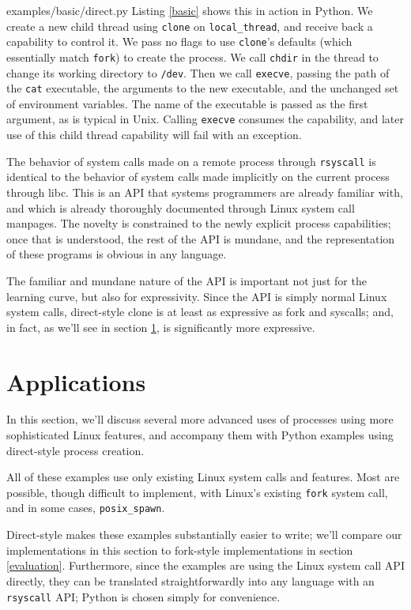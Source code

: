 \documentclass[sigplan]{acmart}
\begin{document}

{examples/basic/direct.py}
Listing \ref{basic} shows this in action in Python.
We create a new child thread using \texttt{clone} on \verb|local_thread|,
and receive back a capability to control it.
We pass no flags to use \texttt{clone}'s defaults
(which essentially match \texttt{fork}) to create the process.
We call \texttt{chdir} in the thread to change its working directory to \texttt{/dev}.
Then we call \texttt{execve},
passing the path of the \texttt{cat} executable,
the arguments to the new executable,
and the unchanged set of environment variables.
The name of the executable is passed as the first argument,
as is typical in Unix.
Calling \texttt{execve} consumes the capability,
and later use of this child thread capability will fail with an exception.

The behavior of system calls made on a remote process through \texttt{rsyscall}
is identical to the behavior of system calls made implicitly on the current process through libc.
This is an API that systems programmers are already familiar with,
and which is already thoroughly documented through Linux system call manpages.
The novelty is constrained to the newly explicit process capabilities;
once that is understood, the rest of the API is mundane,
and the representation of these programs is obvious in any language.

The familiar and mundane nature of the API is important not just for the learning curve,
but also for expressivity.
Since the API is simply normal Linux system calls,
direct-style clone is at least as expressive as fork and syscalls;
and, in fact, as we'll see in section \ref{applications},
is significantly more expressive.
\section{Applications}\label{applications}
In this section,
we'll discuss several more advanced uses of processes
using more sophisticated Linux features,
and accompany them with Python examples using direct-style process creation.

All of these examples use only existing Linux system calls and features.
Most are possible, though difficult to implement,
with Linux's existing \texttt{fork} system call,
and in some cases, \verb|posix_spawn|.

Direct-style makes these examples substantially easier to write;
we'll compare our implementations in this section to fork-style implementations in section \ref{evaluation}.
Furthermore, since the examples are using the Linux system call API directly,
they can be translated straightforwardly into any language with an \texttt{rsyscall} API;
Python is chosen simply for convenience.
\end{document}
